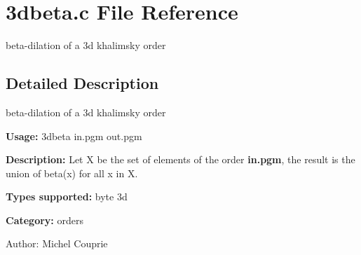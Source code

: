 \section{3dbeta.c File Reference}
\label{3dbeta_8c}
beta-dilation of a 3d khalimsky order 



\subsection{Detailed Description}
beta-dilation of a 3d khalimsky order 

{\bf Usage:} 3dbeta in.pgm out.pgm

{\bf Description:} Let X be the set of elements of the order {\bf in.pgm}, the result is the union of beta(x) for all x in X.

{\bf Types supported:} byte 3d

{\bf Category:} orders

\begin{Desc}
\item[Author:]Michel Couprie \end{Desc}
